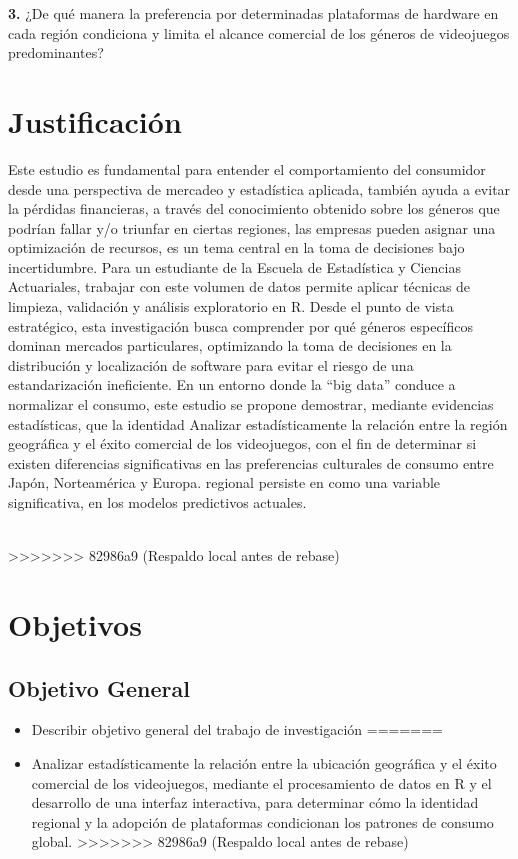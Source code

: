 \documentclass[oneside,11pt]{Latex/Classes/PhDthesisPSnPDF}
\begin{document}
\textbf{3.} ¿De qué manera la preferencia por determinadas plataformas
de hardware en cada región condiciona y limita el alcance comercial de
los géneros de videojuegos predominantes?\\

\section{Justificación}

Este estudio es fundamental para entender el comportamiento del
consumidor desde una perspectiva de mercadeo y estadística aplicada,
también ayuda a evitar la pérdidas financieras, a través del
conocimiento obtenido sobre los géneros que podrían fallar y/o triunfar
en ciertas regiones, las empresas pueden asignar una optimización de
recursos, es un tema central en la toma de decisiones bajo
incertidumbre. Para un estudiante de la Escuela de Estadística y
Ciencias Actuariales, trabajar con este volumen de datos permite aplicar
técnicas de limpieza, validación y análisis exploratorio en R. Desde el
punto de vista estratégico, esta investigación busca comprender por qué
géneros específicos dominan mercados particulares, optimizando la toma
de decisiones en la distribución y localización de software para evitar
el riesgo de una estandarización ineficiente. En un entorno donde la
``big data'' conduce a normalizar el consumo, este estudio se propone
demostrar, mediante evidencias estadísticas, que la identidad Analizar
estadísticamente la relación entre la región geográfica y el éxito
comercial de los videojuegos, con el fin de determinar si existen
diferencias significativas en las preferencias culturales de consumo
entre Japón, Norteamérica y Europa. regional persiste en como una
variable significativa, en los modelos predictivos actuales.\\
\strut \\
>>>>>>> 82986a9 (Respaldo local antes de rebase)

\section{Objetivos}

\subsection{Objetivo General}
\begin{itemize}
<<<<<<< HEAD
  \item{Describir objetivo general del trabajo de investigación}
=======
  \item{Analizar estadísticamente la relación entre la ubicación geográfica y el éxito comercial de los videojuegos, mediante el procesamiento de datos en R y el desarrollo de una interfaz interactiva, para determinar cómo la identidad regional y la adopción de plataformas condicionan los patrones de consumo global.}
>>>>>>> 82986a9 (Respaldo local antes de rebase)
\end{itemize}
\end{document}
